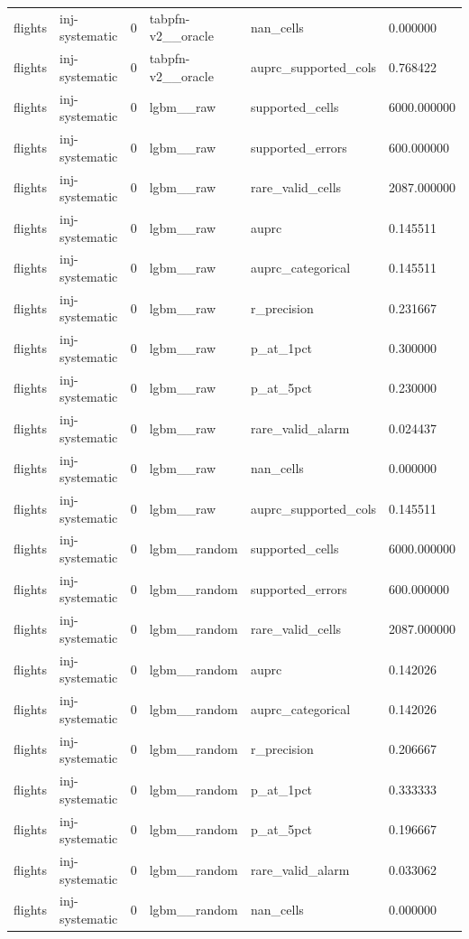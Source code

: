 \begin{tabular}{llllll}
flights & inj-systematic & 0 & tabpfn-v2\_\_oracle & nan\_cells & 0.000000 \\
flights & inj-systematic & 0 & tabpfn-v2\_\_oracle & auprc\_supported\_cols & 0.768422 \\
flights & inj-systematic & 0 & lgbm\_\_raw & supported\_cells & 6000.000000 \\
flights & inj-systematic & 0 & lgbm\_\_raw & supported\_errors & 600.000000 \\
flights & inj-systematic & 0 & lgbm\_\_raw & rare\_valid\_cells & 2087.000000 \\
flights & inj-systematic & 0 & lgbm\_\_raw & auprc & 0.145511 \\
flights & inj-systematic & 0 & lgbm\_\_raw & auprc\_categorical & 0.145511 \\
flights & inj-systematic & 0 & lgbm\_\_raw & r\_precision & 0.231667 \\
flights & inj-systematic & 0 & lgbm\_\_raw & p\_at\_1pct & 0.300000 \\
flights & inj-systematic & 0 & lgbm\_\_raw & p\_at\_5pct & 0.230000 \\
flights & inj-systematic & 0 & lgbm\_\_raw & rare\_valid\_alarm & 0.024437 \\
flights & inj-systematic & 0 & lgbm\_\_raw & nan\_cells & 0.000000 \\
flights & inj-systematic & 0 & lgbm\_\_raw & auprc\_supported\_cols & 0.145511 \\
flights & inj-systematic & 0 & lgbm\_\_random & supported\_cells & 6000.000000 \\
flights & inj-systematic & 0 & lgbm\_\_random & supported\_errors & 600.000000 \\
flights & inj-systematic & 0 & lgbm\_\_random & rare\_valid\_cells & 2087.000000 \\
flights & inj-systematic & 0 & lgbm\_\_random & auprc & 0.142026 \\
flights & inj-systematic & 0 & lgbm\_\_random & auprc\_categorical & 0.142026 \\
flights & inj-systematic & 0 & lgbm\_\_random & r\_precision & 0.206667 \\
flights & inj-systematic & 0 & lgbm\_\_random & p\_at\_1pct & 0.333333 \\
flights & inj-systematic & 0 & lgbm\_\_random & p\_at\_5pct & 0.196667 \\
flights & inj-systematic & 0 & lgbm\_\_random & rare\_valid\_alarm & 0.033062 \\
flights & inj-systematic & 0 & lgbm\_\_random & nan\_cells & 0.000000 \\

\end{tabular}
